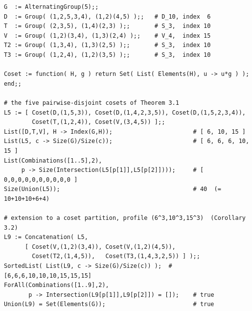 \documentclass[12pt]{article}
\theoremstyle{remark}
\begin{document}
\begingroup
\footnotesize
\begin{verbatim}
G  := AlternatingGroup(5);;
D  := Group( (1,2,5,3,4), (1,2)(4,5) );;   # D_10, index  6
T  := Group( (2,3,5), (1,4)(2,3) );;       # S_3,  index 10
V  := Group( (1,2)(3,4), (1,3)(2,4) );;    # V_4,  index 15
T2 := Group( (1,3,4), (1,3)(2,5) );;       # S_3,  index 10
T3 := Group( (1,2,4), (1,2)(3,5) );;       # S_3,  index 10

Coset := function( H, g ) return Set( List( Elements(H), u -> u*g ) ); end;;

# the five pairwise-disjoint cosets of Theorem 3.1
L5 := [ Coset(D,(1,5,3)), Coset(D,(1,4,2,3,5)), Coset(D,(1,5,2,3,4)),
        Coset(T,(1,2,4)), Coset(V,(3,4,5)) ];;
List([D,T,V], H -> Index(G,H));                       # [ 6, 10, 15 ]
List(L5, c -> Size(G)/Size(c));                       # [ 6, 6, 6, 10, 15 ]
List(Combinations([1..5],2),
     p -> Size(Intersection(L5[p[1]],L5[p[2]])));     # [ 0,0,0,0,0,0,0,0,0,0 ]
Size(Union(L5));                                      # 40  (= 10+10+10+6+4)

# extension to a coset partition, profile (6^3,10^3,15^3)  (Corollary 3.2)
L9 := Concatenation( L5,
      [ Coset(V,(1,2)(3,4)), Coset(V,(1,2)(4,5)),
        Coset(T2,(1,4,5)),   Coset(T3,(1,4,3,2,5)) ] );;
SortedList( List(L9, c -> Size(G)/Size(c)) );  # [6,6,6,10,10,10,15,15,15]
ForAll(Combinations([1..9],2),
       p -> Intersection(L9[p[1]],L9[p[2]]) = []);    # true
Union(L9) = Set(Elements(G));                         # true
\end{verbatim}
\endgroup
\end{document}
